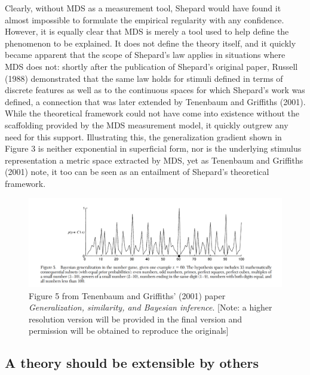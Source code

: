 \documentclass[english,doc]{apa6}
\begin{document}
Clearly, without MDS as a measurement tool, Shepard would have found it almost impossible to formulate the empirical regularity with any confidence. However, it is equally clear that MDS is merely a tool used to help define the phenomenon to be explained. It does not define the theory itself, and it quickly became apparent that the scope of Shepard's law applies in situations where MDS does not: shortly after the publication of Shepard's original paper, Russell (1988) demonstrated that the same law holds for stimuli defined in terms of discrete features as well as to the continuous spaces for which Shepard's work was defined, a connection that was later extended by Tenenbaum and Griffiths (2001). While the theoretical framework could not have come into existence without the scaffolding provided by the MDS measurement model, it quickly outgrew any need for this support. Illustrating this, the generalization gradient shown in Figure 3 is neither exponential in superficial form, nor is the underlying stimulus representation a metric space extracted by MDS, yet as Tenenbaum and Griffiths (2001) note, it too can be seen as an entailment of Shepard's theoretical framework.



\begin{figure}[t]
\includegraphics[width=6.07in]{tenenbaum_figure5} \caption{Figure 5 from Tenenbaum and Griffiths' (2001) paper \emph{Generalization, similarity, and Bayesian inference}. {[}Note: a higher resolution version will be provided in the final version and permission will be obtained to reproduce the originals{]}}\label{fig:unnamed-chunk-3}
\end{figure}

\hypertarget{a-theory-should-be-extensible-by-others}{%
\subsection{A theory should be extensible by others}\label{a-theory-should-be-extensible-by-others}}
\end{document}
